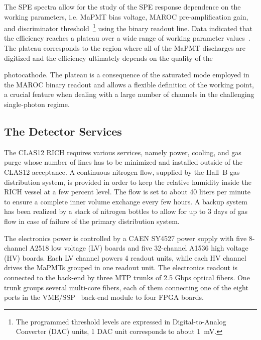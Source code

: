 \documentclass[5p,times,twocolumn]{elsarticle}
\def\MaPMTs{MaPMTs }
\begin{document}
\clearpage

The SPE spectra allow for the study of the SPE response dependence on the working parameters, i.e. MaPMT
bias voltage, MAROC pre-amplification gain, and discriminator threshold~\footnote{The programmed threshold
levels are expressed in Digital-to-Analog Converter (DAC) units, 1 DAC unit corresponds to about 1~mV.} using the
binary readout line. Data indicated that the efficiency reaches a plateau over a wide range of working parameter
values~\cite{Ref:RICHElectro}. %
The plateau corresponds to the region where all of the MaPMT discharges  are digitized and the efficiency ultimately
depends on the quality of the 

\noindent
photocathode. The plateau is a consequence of the saturated mode employed in the
MAROC binary readout and allows a flexible definition of the working point, a crucial feature when 
dealing with a large number of channels in the challenging single-photon regime.

\subsection{The Detector Services}

The CLAS12 RICH requires various services, namely power, cooling, and gas purge whose number of lines has to be
minimized and installed outside of the CLAS12 acceptance. A continuous nitrogen flow, supplied by the Hall~B gas
distribution system, is provided in order to keep the relative humidity inside the RICH vessel at a few percent
level. The flow is set to about 40 liters per minute to ensure a complete inner volume exchange every few hours. 
A backup system has been realized by a stack of nitrogen bottles to allow for up to 3 days of gas flow in case of
failure of the primary distribution system.

The electronics power is controlled by a CAEN SY4527 power supply with five 8-channel A2518 low voltage (LV) boards and five
32-channel A1536 high voltage (HV) boards. Each LV channel powers 4 readout units, while each HV channel drives the \MaPMTs grouped in one readout unit. The
electronics readout is connected to the back-end by three MTP trunks of 2.5 Gbps optical fibers. One trunk groups
several multi-core fibers, each of them connecting one of the eight ports in the VME/SSP~\cite{daq-nim} back-end
module to four FPGA boards.
\end{document}
